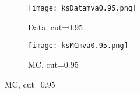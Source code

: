 \begin{figure}[H]
	\ContinuedFloat
	\begin{subfigure}{0.5\linewidth}
		\caption{Data, cut=0.95}
		\texttt{[image: ksDatamva0.95.png]}
	\end{subfigure}
	\begin{subfigure}{0.5\linewidth}
		\caption{MC, cut=0.95}
		\texttt{[image: ksMCmva0.95.png]}
	\end{subfigure}
	
\end{figure}
